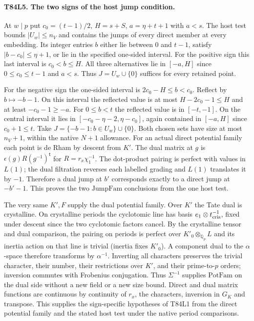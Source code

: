 \paragraph{T84L5. The two signs of the host jump condition.}
At $w\mid p$ put $c_0=(t-1)/2$, $H=s+S$, $a=\eta+t+1$
with $a<s$. The host test bounds $|U_w|\le n_V$ and contains
the jumps of every direct member at every embedding. Its
integer entries $b$ either lie between $0$ and $t-1$, satisfy
$|b-c_0|\le\eta+1$, or lie in the specified one-sided interval.
For the positive sign this last interval is
$c_0<b\le H$. All three alternatives lie in $[-a,H]$ since
$0\le c_0\le t-1$ and $a<s$. Thus $J=U_w\cup\{0\}$
suffices for every retained point.

For the negative sign the one-sided interval is
$2c_0-H\le b<c_0$. Reflect by $b\mapsto-b-1$. On this
interval the reflected value is at most $H-2c_0-1\le H$
and at least $-c_0-1\ge-a$. For $0\le b<t$ the reflected
value is in $[-t,-1]$. On the central interval it lies in
$[-c_0-\eta-2,\eta-c_0]$, again contained in $[-a,H]$
since $c_0+1\le t$. Take $J=\{-b-1:b\in U_w\}\cup\{0\}$.
Both chosen sets have size at most $n_V+1$, within the native
$N+1$ allowance. For an actual direct potential family each
point is de Rham by descent from $K'$. The dual matrix at $g$
is $\epsilon(g)R(g^{-1})^{\mathsf t}$ for $R=r_x\chi_1^{-1}$.
The dot-product pairing is perfect with values in $L(1)$;
the dual filtration reverses each labelled grading and $L(1)$
translates it by $-1$. Therefore a dual jump at $b'$ corresponds
exactly to a direct jump at $-b'-1$. This proves the two
$\mathrm{JumpFam}$ conclusions from the one host test.

The very same $K',F$ supply the dual potential family. Over $K'$
the Tate dual is crystalline. On crystalline periods the
cyclotomic line has basis $e_1\otimes t_{\rm cris}^{-1}$,
fixed under descent since the two cyclotomic factors cancel.
By the crystalline tensor and dual comparison, the pairing
on periods is perfect over $K'_0\otimes_{\mathbb Q_p}L$ and its
inertia action on that line is trivial (inertia fixes $K'_0$).
A component dual to the $\alpha$-space therefore transforms by
$\alpha^{-1}$. Inverting all characters preserves the
trivial character, their number, their restrictions over
$K'$, and their prime-to-$p$ orders; inversion commutes with
Frobenius conjugation. Thus $\Sigma^{-1}$ supplies
$\mathrm{PotFam}$ on the dual side without a new field or a
new size bound. Direct and dual matrix functions are continuous
by continuity of $r_x$, the characters, inversion in $G_K$ and
transpose. This supplies the sign-specific hypotheses of T84L1
from the direct potential family and the stated host test under
the native period comparisons.

